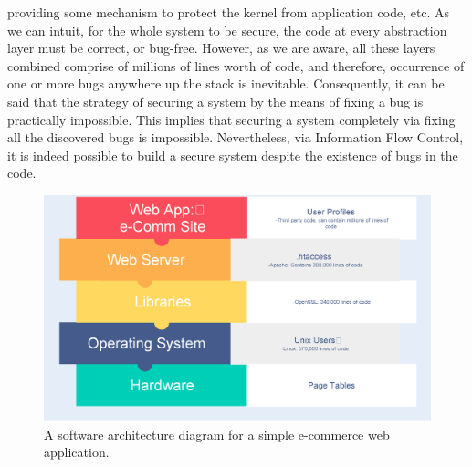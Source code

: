 providing some mechanism to protect the kernel from application code, etc. As we can intuit, for the whole system to be secure, the code at every abstraction layer must be correct, or bug-free. However, as we are aware, all these layers combined comprise of millions of lines worth of code, and therefore, occurrence of one or more bugs anywhere up the stack is inevitable. Consequently, it can be said that the strategy of securing a system by the means of fixing a bug is practically impossible. This implies that securing a system completely via fixing all the discovered bugs is impossible. Nevertheless, via Information Flow Control, it is indeed possible to build a secure system despite the existence of bugs in the code.

\begin{figure}[h]
	\begin{framed}
		\centering
		\includegraphics[width=\textwidth]{images/architectures.eps}
		\caption{A software architecture diagram for a simple e-commerce web application.}
		\label{fig:eCommerceArchitecture}
	\end{framed}
\end{figure}

